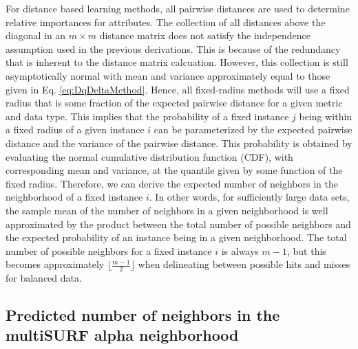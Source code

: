 \documentclass[10pt,letterpaper]{article}\usepackage[]{graphicx}\usepackage[]{color}
\begin{document}
For distance based learning methods, all pairwise distances are used to determine relative importances for attributes. The collection of all distances above the diagonal in an $m \times m$ distance matrix does not satisfy the independence assumption used in the previous derivations. This is because of the redundancy that is inherent to the distance matrix calcuation. However, this collection is still asymptotically normal with mean and variance approximately equal to those given in Eq. \ref{eq:DqDeltaMethod}. Hence, all fixed-radius methods will use a fixed radius that is some fraction of the expected pairwise distance for a given metric and data type. This implies that the probability of a fixed instance $j$ being within a fixed radius of a given instance $i$ can be parameterized by the expected pairwise distance and the variance of the pairwise distance. This probability is obtained by evaluating the normal cumulative distribution function (CDF), with corresponding mean and variance, at the quantile given by some function of the fixed radius. Therefore, we can derive the expected number of neighbors in the neighborhood of a fixed instance $i$. In other words, for sufficiently large data sets, the sample mean of the number of neighbors in a given neighborhood is well approximated by the product between the total number of possible neighbors and the expected probability of an instance being in a given neighborhood. The total number of possible neighbors for a fixed instance $i$ is always $m-1$, but this becomes approximately $\lfloor{\frac{m - 1}{2}}\rfloor$ when delineating between possible hits and misses for balanced data.

\subsection{Predicted number of neighbors in the multiSURF alpha neighborhood}
\end{document}
